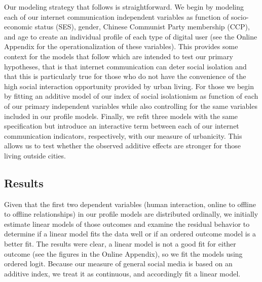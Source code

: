 \documentclass[
  letterpaper,
  DIV=11,
  numbers=noendperiod]{scrartcl}
\begin{document}
Our modeling strategy that follows is straightforward. We begin by
modeling each of our internet communication independent variables as
function of socio-economic status (SES), gender, Chinese Communist Party
membership (CCP), and age to create an individual profile of each type
of digital user (see the Online Appendix for the operationalization of
these variables). This provides some context for the models that follow
which are intended to test our primary hypotheses, that is that internet
communication can deter social isolation and that this is particularly
true for those who do not have the convenience of the high social
interaction opportunity provided by urban living. For those we begin by
fitting an additive model of our index of social isolationism as
function of each of our primary independent variables while also
controlling for the same variables included in our profile models.
Finally, we refit three models with the same specification but introduce
an interactive term between each of our internet communication
indicators, respectively, with our measure of urbanicity. This allows us
to test whether the observed additive effects are stronger for those
living outside cities.

\hypertarget{results}{%
\subsection{Results}\label{results}}

Given that the first two dependent variables (human interaction, online
to offline to offline relationships) in our profile models are
distributed ordinally, we initially estimate linear models of those
outcomes and examine the residual behavior to determine if a linear
model fits the data well or if an ordered outcome model is a better fit.
The results were clear, a linear model is not a good fit for either
outcome (see the figures in the Online Appendix), so we fit the models
using ordered logit. Because our measure of general social media is
based on an additive index, we treat it as continuous, and accordingly
fit a linear model.
\end{document}
